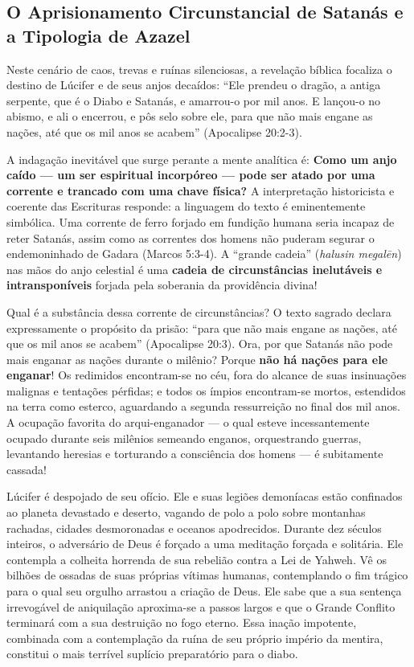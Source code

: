 \documentclass[11pt,a4paper,openany]{book}
\begin{document}
\subsection{O Aprisionamento Circunstancial de Satanás e a Tipologia de Azazel}


Neste cenário de caos, trevas e ruínas silenciosas, a revelação bíblica focaliza o destino de Lúcifer e de seus anjos decaídos:
``Ele prendeu o dragão, a antiga serpente, que é o Diabo e Satanás, e amarrou-o por mil anos. E lançou-o no abismo, e ali o encerrou, e pôs selo sobre ele, para que não mais engane as nações, até que os mil anos se acabem'' (Apocalipse 20:2-3).

A indagação inevitável que surge perante a mente analítica é: \textbf{Como um anjo caído — um ser espiritual incorpóreo — pode ser atado por uma corrente e trancado com uma chave física?}
A interpretação historicista e coerente das Escrituras responde: a linguagem do texto é eminentemente simbólica. Uma corrente de ferro forjado em fundição humana seria incapaz de reter Satanás, assim como as correntes dos homens não puderam segurar o endemoninhado de Gadara (Marcos 5:3-4). A ``grande cadeia'' (\textit{halusin megalēn}) nas mãos do anjo celestial é uma \textbf{cadeia de circunstâncias inelutáveis e intransponíveis} forjada pela soberania da providência divina!

Qual é a substância dessa corrente de circunstâncias?
O texto sagrado declara expressamente o propósito da prisão: ``para que não mais engane as nações, até que os mil anos se acabem'' (Apocalipse 20:3).
Ora, por que Satanás não pode mais enganar as nações durante o milênio?
Porque \textbf{não há nações para ele enganar}!
Os redimidos encontram-se no céu, fora do alcance de suas insinuações malignas e tentações pérfidas; e todos os ímpios encontram-se mortos, estendidos na terra como esterco, aguardando a segunda ressurreição no final dos mil anos. A ocupação favorita do arqui-enganador — o qual esteve incessantemente ocupado durante seis milênios semeando enganos, orquestrando guerras, levantando heresias e torturando a consciência dos homens — é subitamente cassada!

Lúcifer é despojado de seu ofício. Ele e suas legiões demoníacas estão confinados ao planeta devastado e deserto, vagando de polo a polo sobre montanhas rachadas, cidades desmoronadas e oceanos apodrecidos. Durante dez séculos inteiros, o adversário de Deus é forçado a uma meditação forçada e solitária. Ele contempla a colheita horrenda de sua rebelião contra a Lei de Yahweh. Vê os bilhões de ossadas de suas próprias vítimas humanas, contemplando o fim trágico para o qual seu orgulho arrastou a criação de Deus. Ele sabe que a sua sentença irrevogável de aniquilação aproxima-se a passos largos e que o Grande Conflito terminará com a sua destruição no fogo eterno. Essa inação impotente, combinada com a contemplação da ruína de seu próprio império da mentira, constitui o mais terrível suplício preparatório para o diabo.
\end{document}
